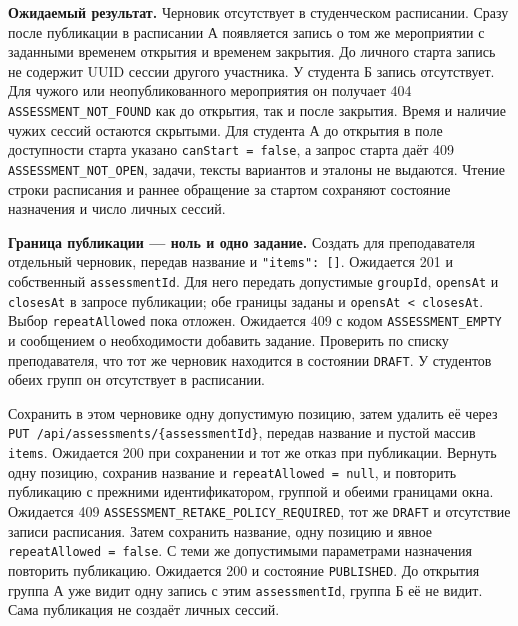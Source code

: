 \documentclass[12pt,a4paper]{article}
\begin{document}
\textbf{Ожидаемый результат.} Черновик отсутствует в студенческом расписании. Сразу после публикации в расписании А появляется запись о том же мероприятии с заданными временем открытия и временем закрытия. До личного старта запись не содержит UUID сессии другого участника. У студента Б запись отсутствует. Для чужого или неопубликованного мероприятия он получает 404 \texttt{ASSESSMENT\_\allowbreak{}NOT\_\allowbreak{}FOUND} как до открытия, так и после закрытия. Время и наличие чужих сессий остаются скрытыми. Для студента А до открытия в поле доступности старта указано \texttt{can\allowbreak{}Start =\allowbreak{} false}, а запрос старта даёт 409 \texttt{ASSESSMENT\_\allowbreak{}NOT\_\allowbreak{}OPEN}, задачи, тексты вариантов и эталоны не выдаются. Чтение строки расписания и раннее обращение за стартом сохраняют состояние назначения и число личных сессий.

\textbf{Граница публикации --- ноль и одно задание.} Создать для преподавателя отдельный черновик, передав название и \texttt{"items":\ {[}{]}}. Ожидается 201 и собственный \texttt{assessment\allowbreak{}Id}. Для него передать допустимые \texttt{groupId}, \texttt{opensAt} и \texttt{closesAt} в запросе публикации; обе границы заданы и \texttt{opens\allowbreak{}At < closes\allowbreak{}At}. Выбор \texttt{repeat\allowbreak{}Allowed} пока отложен. Ожидается 409 с кодом \texttt{ASSESSMENT\_\allowbreak{}EMPTY} и сообщением о необходимости добавить задание. Проверить по списку преподавателя, что тот же черновик находится в состоянии \texttt{DRAFT}. У студентов обеих групп он отсутствует в расписании.

Сохранить в этом черновике одну допустимую позицию, затем удалить её через \texttt{PUT /\allowbreak{}api/\allowbreak{}assessments/\allowbreak{}\{assessment\allowbreak{}Id\}}, передав название и пустой массив \texttt{items}. Ожидается 200 при сохранении и тот же отказ при публикации. Вернуть одну позицию, сохранив название и \texttt{repeat\allowbreak{}Allowed =\allowbreak{} null}, и повторить публикацию с прежними идентификатором, группой и обеими границами окна. Ожидается 409 \texttt{ASSESSMENT\_\allowbreak{}RETAKE\_\allowbreak{}POLICY\_\allowbreak{}REQUIRED}, тот же \texttt{DRAFT} и отсутствие записи расписания. Затем сохранить название, одну позицию и явное \texttt{repeat\allowbreak{}Allowed =\allowbreak{} false}. С теми же допустимыми параметрами назначения повторить публикацию. Ожидается 200 и состояние \texttt{PUBLISHED}. До открытия группа А уже видит одну запись с этим \texttt{assessment\allowbreak{}Id}, группа Б её не видит. Сама публикация не создаёт личных сессий.
\end{document}
